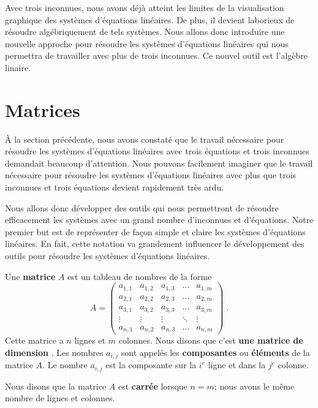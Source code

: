 {Avec trois inconnues, nous avons déjà atteint les limites de la
visualisation graphique des systèmes d'équations linéaires.  De plus,
il devient laborieux de résoudre algébriquement de tels systèmes.  Nous
allons donc introduire une nouvelle approche pour résoudre les systèmes
d'équations linéaires qui nous permettra de travailler avec plus de
trois inconnues.  Ce nouvel outil est l'algèbre linaire.

\section{Matrices}

À la section précédente, nous avons constaté que le travail nécessaire pour
résoudre les systèmes d'équations linéaires avec trois équations et
trois inconnues demandait beaucoup d'attention.  Nous pouvons facilement
imaginer que le travail nécessaire pour résoudre les systèmes
d'équations linéaires avec plus que trois inconnues et trois équations
devient rapidement très ardu.

Nous allons donc développer des outils qui nous permettront de
résoudre efficacement les systèmes avec un grand nombre d'inconnues et
d'équations. Notre premier but est de représenter de façon simple et
claire les systèmes d'équations linéaires.  En fait, cette notation va
grandement influencer le développement des outils pour résoudre les
systèmes d'équations linéaires.

\begin{focus}{\dfn}
Une {\bfseries matrice} $A$ est un tableau de nombres
de la forme
\[
A =
\begin{pmatrix}
a_{1,1} & a_{1,2} & a_{1,3} & \ldots & a_{1,m} \\
a_{2,1} & a_{2,2} & a_{2,3} & \ldots & a_{2,m} \\
a_{3,1} & a_{3,2} & a_{3,3} & \ldots & a_{3,m} \\
\vdots & \vdots & \vdots & \ddots & \vdots \\
a_{n,1} & a_{n,2} & a_{n,3} & \ldots & a_{n,m}
\end{pmatrix} \; .
\]
Cette matrice a $n$ lignes et $m$ colonnes.  Nous disons que c'est
{\bfseries une matrice de dimension }.  Les nombres $a_{i,j}$
sont appelés les {\bfseries composantes} ou {\bfseries éléments} de la
matrice $A$.  Le nombre $a_{i,j}$ est la composante sur la $i^{e}$
ligne et dans la $j^{e}$ colonne.

Nous disons que la matrice $A$ est {\bfseries carrée} lorsque $n=m$;
nous avons le même nombre de lignes et colonnes.
\end{focus}

}
